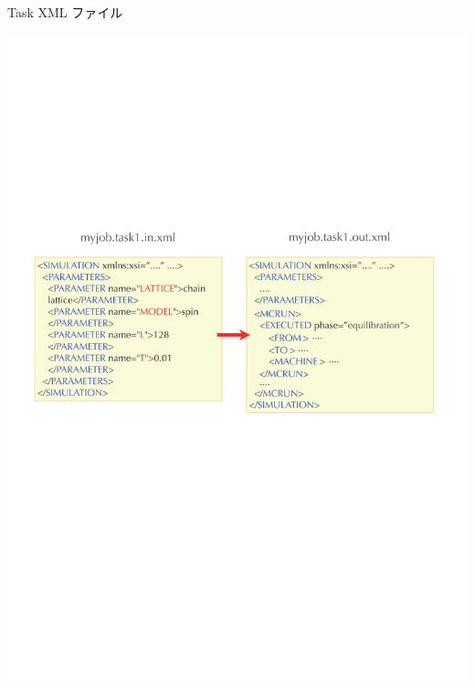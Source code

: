 \subsection*{\redm\whiteb\greenb}
\begin{frame}{Task XML ファイル}
  \begin{center}
    \includegraphics[height=.6\textheight]{simulation3.pdf}
  \end{center}
\end{frame}

